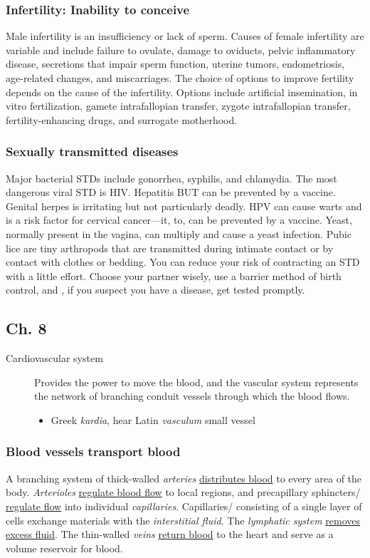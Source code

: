 \documentclass[11pt]{article}
\begin{document}
\subsubsection{Infertility: Inability to conceive}
\label{sec:org6fc4d55}
Male infertility is an insufficiency or lack of sperm. Causes of female
infertility are variable and include failure to ovulate, damage to oviducts,
pelvic inflammatory disease, secretions that impair sperm function, uterine
tumors, endometriosis, age-related changes, and miscarriages. The choice of
options to improve fertility depends on the cause of the infertility. Options
include artificial insemination, in vitro fertilization, gamete intrafallopian
transfer, zygote intrafallopian transfer, fertility-enhancing drugs, and
surrogate motherhood.

\subsubsection{Sexually transmitted diseases}
\label{sec:orgebe445d}
Major bacterial STDs include gonorrhea, syphilis, and chlamydia. The most
dangerous viral STD is HIV. Hepatitis BUT can be prevented by a vaccine. Genital
herpes is irritating but not particularly deadly. HPV can cause warts and is a
risk factor for cervical cancer---it, to, can be prevented by a vaccine. Yeast,
normally present in the vagina, can multiply and cause a yeast infection. Pubic
lice are tiny arthropods that are transmitted during intimate contact or by
contact with clothes or bedding. You can reduce your risk of contracting an STD
with a little effort. Choose your partner wisely, use a barrier method of birth
control, and , if you suspect you have a disease, get tested promptly.

\subsection{Ch. 8}
\label{sec:orgdb0129b}
\begin{description}
\item[{Cardiovascular system}] Provides the power to move the blood, and the
vascular system represents the network of branching conduit vessels
through which the blood flows.
\begin{itemize}
\item Greek \emph{kardia}, hear Latin \emph{vasculum} small vessel
\end{itemize}
\end{description}

\subsubsection{Blood vessels transport blood}
\label{sec:org64e77af}
A branching system of thick-walled \emph{arteries} \uline{distributes blood} to every area of
the body. \emph{Arterioles} \uline{regulate blood flow} to local regions, and precapillary
sphincters/ \uline{regulate flow} into individual \emph{capillaries}. Capillaries/ consisting
of a single layer of cells exchange materials with the \emph{interstitial fluid}. The
\emph{lymphatic system} \uline{removes excess fluid}. The thin-walled \emph{veins} \uline{return blood} to the
heart and serve as a volume reservoir for blood.
\end{document}
